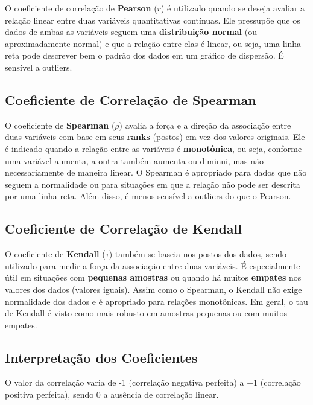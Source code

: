 \documentclass[
]{book}
\begin{document}
O coeficiente de correlação de \textbf{Pearson} (\(r\)) é utilizado quando se deseja avaliar a relação linear entre duas variáveis quantitativas contínuas. Ele pressupõe que os dados de ambas as variáveis seguem uma \textbf{distribuição normal} (ou aproximadamente normal) e que a relação entre elas é linear, ou seja, uma linha reta pode descrever bem o padrão dos dados em um gráfico de dispersão. É sensível a outliers.

\subsection{Coeficiente de Correlação de Spearman}\label{coeficiente-de-correlauxe7uxe3o-de-spearman}

O coeficiente de \textbf{Spearman} (\(\rho\)) avalia a força e a direção da associação entre duas variáveis com base em seus \textbf{ranks} (postos) em vez dos valores originais. Ele é indicado quando a relação entre as variáveis é \textbf{monotônica}, ou seja, conforme uma variável aumenta, a outra também aumenta ou diminui, mas não necessariamente de maneira linear. O Spearman é apropriado para dados que não seguem a normalidade ou para situações em que a relação não pode ser descrita por uma linha reta. Além disso, é menos sensível a outliers do que o Pearson.

\subsection{Coeficiente de Correlação de Kendall}\label{coeficiente-de-correlauxe7uxe3o-de-kendall}

O coeficiente de \textbf{Kendall} (\(\tau\)) também se baseia nos postos dos dados, sendo utilizado para medir a força da associação entre duas variáveis. É especialmente útil em situações com \textbf{pequenas amostras} ou quando há muitos \textbf{empates} nos valores dos dados (valores iguais). Assim como o Spearman, o Kendall não exige normalidade dos dados e é apropriado para relações monotônicas. Em geral, o tau de Kendall é visto como mais robusto em amostras pequenas ou com muitos empates.

\subsection{Interpretação dos Coeficientes}\label{interpretauxe7uxe3o-dos-coeficientes}

O valor da correlação varia de -1 (correlação negativa perfeita) a +1 (correlação positiva perfeita), sendo 0 a ausência de correlação linear.
\end{document}
